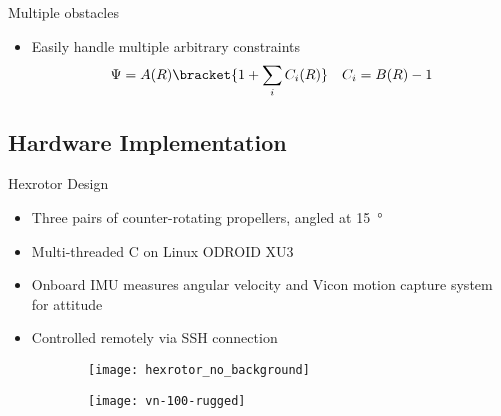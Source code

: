 \documentclass[11pt,professionalfonts]{beamer}
\begin{document}
\begin{frame}{Multiple obstacles}%

\begin{itemize}
	\item Easily handle multiple arbitrary constraints 
	\begin{align*}
		\Psi = A(R) \bracket{1 + \sum_i C_i(R)} \quad C_i = B(R) - 1
	\end{align*}
\end{itemize}

\begin{figure}
	\centering
\end{figure}

\end{frame}%

\subsection*{Hardware Implementation}

\begin{frame}{Hexrotor Design} %
	\begin{itemize}
		\item Three pairs of counter-rotating propellers, angled at \SI{15}{\degree}
		\item Multi-threaded C on Linux ODROID XU3
		\item Onboard IMU measures angular velocity and Vicon motion capture system for attitude
		\item Controlled remotely via SSH connection
	\end{itemize}
	
	\begin{figure} 
		\centering 
		\begin{subfigure}[b]{0.4\textwidth} 
			\texttt{[image: hexrotor\_no\_background]} 
		\end{subfigure}\hfill %
		\begin{subfigure}[b]{0.4\textwidth} 
			\texttt{[image: vn-100-rugged]} 
		\end{subfigure}
	\end{figure}
\end{frame} %
\end{document}
